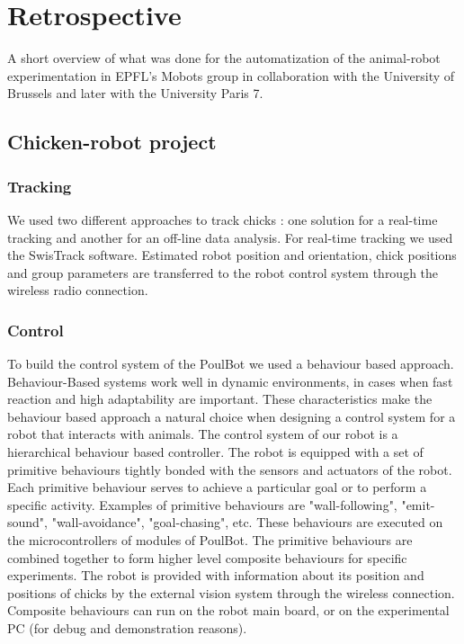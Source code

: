 \documentclass{styles/assisi}
\begin{document}
\section{Retrospective}
A short overview of what was done for the automatization of the animal-robot experimentation in EPFL's Mobots group in collaboration with the University of Brussels and later with the University Paris 7.

\subsection{Chicken-robot project}
\subsubsection{Tracking}
We used two different approaches to track chicks : one solution for a real-time tracking and another for an off-line data analysis. For real-time tracking we used the SwisTrack software. Estimated robot position and orientation, chick positions and group parameters are transferred to the robot control system through the wireless radio connection.

\subsubsection{Control}
To build the control system of the PoulBot we used a behaviour based approach. Behaviour-Based systems work well in dynamic environments, in cases when fast reaction and high adaptability are important. These characteristics make the behaviour based approach a natural choice when designing a control system for a robot that interacts with animals. The control system of our robot is a hierarchical behaviour based controller. The robot is equipped with a set of primitive behaviours tightly bonded with the sensors and actuators of the robot. Each primitive behaviour serves to achieve a particular goal or to perform a specific activity. Examples of primitive behaviours are "wall-following", "emit-sound", "wall-avoidance", "goal-chasing", etc. These behaviours are executed on the microcontrollers of modules of PoulBot. The primitive behaviours are combined together to form higher level composite behaviours for specific experiments. The robot is provided with information about its position and positions of chicks by the external vision system through the wireless connection. Composite behaviours can run on the robot main board, or on the experimental PC (for debug and demonstration reasons).
\end{document}

